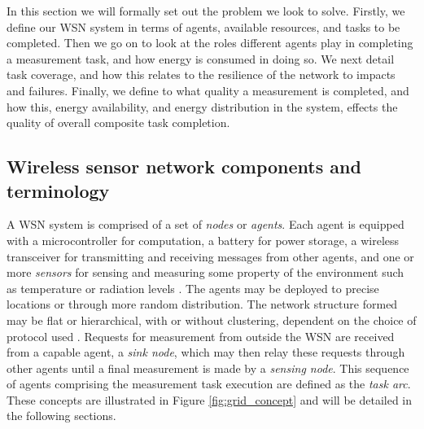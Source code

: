 In this section we will formally set out the problem we look to solve. Firstly, we define our WSN system in terms of agents, available resources, and tasks to be completed. Then we go on to look at the roles different agents play in completing a measurement task, and how energy is consumed in doing so. We next detail task coverage, and how this relates to the resilience of the network to impacts and failures. Finally, we define to what quality a measurement is completed, and how this, energy availability, and energy distribution in the system, effects the quality of overall composite task completion. 

\subsection{Wireless sensor network components and terminology}

A WSN system is comprised of a set of \textit{nodes} or \textit{agents}. Each agent is equipped with a microcontroller for computation, a battery for power storage, a wireless transceiver for  transmitting and receiving messages from other agents, and one or more \textit{sensors} for sensing and measuring some property of the environment such as temperature or radiation levels \citep{muhammad_r_ahmed_2012_1072589}. The agents may be deployed to precise locations or through more random distribution. The network structure formed may be flat or hierarchical, with or without clustering, dependent on the choice of protocol used \citep{Carlos-Mancilla2016b}. Requests for measurement from outside the WSN are received from a capable agent, a \textit{sink node}, which may then relay these requests through other agents until a final measurement is made by a \textit{sensing node}. This sequence of agents comprising the measurement task execution are defined as the \textit{task arc}. These concepts are illustrated in Figure \ref{fig:grid_concept} and will be detailed in the following sections.